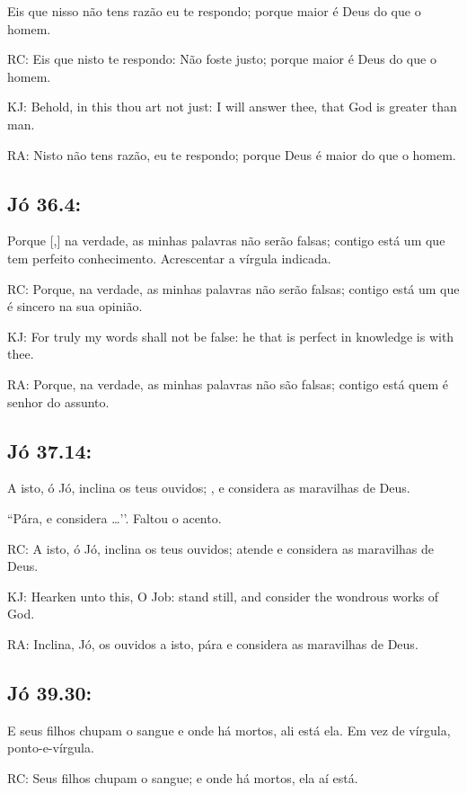  Eis que nisso não tens razão\uwave{;} eu te respondo; porque maior é Deus do que o homem.

RC: Eis que nisto te respondo: Não foste justo; porque maior é Deus do que o homem.

KJ: Behold, in this thou art not just: I will answer thee, that God is greater than man.

RA: Nisto não tens razão, eu te respondo; porque Deus é maior do que o homem.

\subsection{Jó 36.4:}

 Porque [,] na verdade, as minhas palavras não serão falsas; contigo está um que tem perfeito conhecimento.
Acrescentar a vírgula indicada.

RC: Porque, na verdade, as minhas palavras não serão falsas; contigo está um que é sincero na sua opinião.

KJ: For truly my words shall not be false: he that is perfect in knowledge is with thee.

RA: Porque, na verdade, as minhas palavras não são falsas; contigo está quem é senhor do assunto.

\subsection{Jó 37.14:}

 A isto, ó Jó, inclina os teus ouvidos; , e considera as maravilhas de Deus.

``Pára, e considera \ldots’’. Faltou o acento.

RC: A isto, ó Jó, inclina os teus ouvidos; atende e considera as maravilhas de Deus.

KJ: Hearken unto this, O Job: stand still, and consider the wondrous works of God.

RA: Inclina, Jó, os ouvidos a isto, pára e considera as maravilhas de Deus.

\subsection{Jó 39.30:}

 E seus filhos chupam o sangue\uwave{,} e onde há mortos, ali está ela.
Em vez de vírgula, ponto-e-vírgula. 

RC: Seus filhos chupam o sangue; e onde há mortos, ela aí está.

